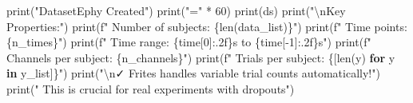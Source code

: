 \documentclass[
  11pt,
  letterpaper,
  oneside,
  openany]{book}
\newenvironment{Shaded}{\begin{snugshade}}{\end{snugshade}}
\newcommand{\BuiltInTok}[1]{\textcolor[rgb]{0.00,0.23,0.31}{#1}}
\newcommand{\CharTok}[1]{\textcolor[rgb]{0.13,0.47,0.30}{#1}}
\newcommand{\ControlFlowTok}[1]{\textcolor[rgb]{0.00,0.23,0.31}{\textbf{#1}}}
\newcommand{\DecValTok}[1]{\textcolor[rgb]{0.68,0.00,0.00}{#1}}
\newcommand{\KeywordTok}[1]{\textcolor[rgb]{0.00,0.23,0.31}{\textbf{#1}}}
\newcommand{\NormalTok}[1]{\textcolor[rgb]{0.00,0.23,0.31}{#1}}
\newcommand{\OperatorTok}[1]{\textcolor[rgb]{0.37,0.37,0.37}{#1}}
\newcommand{\SpecialCharTok}[1]{\textcolor[rgb]{0.37,0.37,0.37}{#1}}
\newcommand{\SpecialStringTok}[1]{\textcolor[rgb]{0.13,0.47,0.30}{#1}}
\newcommand{\StringTok}[1]{\textcolor[rgb]{0.13,0.47,0.30}{#1}}
\begin{document}
\begin{Shaded}
\begin{Highlighting}[]
\BuiltInTok{print}\NormalTok{(}\StringTok{"DatasetEphy Created"}\NormalTok{)}
\BuiltInTok{print}\NormalTok{(}\StringTok{"="} \OperatorTok{*} \DecValTok{60}\NormalTok{)}
\BuiltInTok{print}\NormalTok{(ds)}
\BuiltInTok{print}\NormalTok{(}\StringTok{"}\CharTok{\textbackslash{}n}\StringTok{Key Properties:"}\NormalTok{)}
\BuiltInTok{print}\NormalTok{(}\SpecialStringTok{f"  Number of subjects: }\SpecialCharTok{\{}\BuiltInTok{len}\NormalTok{(data\_list)}\SpecialCharTok{\}}\SpecialStringTok{"}\NormalTok{)}
\BuiltInTok{print}\NormalTok{(}\SpecialStringTok{f"  Time points: }\SpecialCharTok{\{}\NormalTok{n\_times}\SpecialCharTok{\}}\SpecialStringTok{"}\NormalTok{)}
\BuiltInTok{print}\NormalTok{(}\SpecialStringTok{f"  Time range: }\SpecialCharTok{\{}\NormalTok{time[}\DecValTok{0}\NormalTok{]}\SpecialCharTok{:.2f\}}\SpecialStringTok{s to }\SpecialCharTok{\{}\NormalTok{time[}\OperatorTok{{-}}\DecValTok{1}\NormalTok{]}\SpecialCharTok{:.2f\}}\SpecialStringTok{s"}\NormalTok{)}
\BuiltInTok{print}\NormalTok{(}\SpecialStringTok{f"  Channels per subject: }\SpecialCharTok{\{}\NormalTok{n\_channels}\SpecialCharTok{\}}\SpecialStringTok{"}\NormalTok{)}
\BuiltInTok{print}\NormalTok{(}\SpecialStringTok{f"  Trials per subject: }\SpecialCharTok{\{}\NormalTok{[}\BuiltInTok{len}\NormalTok{(y) }\ControlFlowTok{for}\NormalTok{ y }\KeywordTok{in}\NormalTok{ y\_list]}\SpecialCharTok{\}}\SpecialStringTok{"}\NormalTok{)}
\BuiltInTok{print}\NormalTok{(}\StringTok{"}\CharTok{\textbackslash{}n}\StringTok{✓ Frites handles variable trial counts automatically!"}\NormalTok{)}
\BuiltInTok{print}\NormalTok{(}\StringTok{"  This is crucial for real experiments with dropouts"}\NormalTok{)}
\end{Highlighting}
\end{Shaded}
\end{document}

